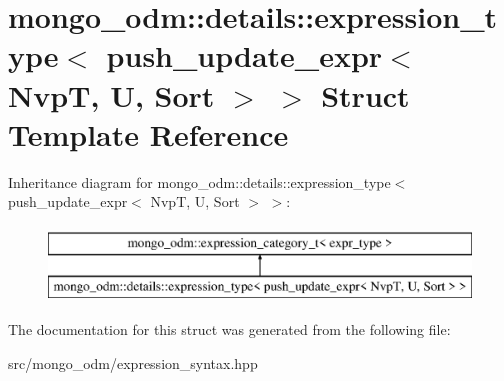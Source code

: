 \hypertarget{structmongo__odm_1_1details_1_1expression__type_3_01push__update__expr_3_01NvpT_00_01U_00_01Sort_01_4_01_4}{}\section{mongo\+\_\+odm\+:\+:details\+:\+:expression\+\_\+type$<$ push\+\_\+update\+\_\+expr$<$ NvpT, U, Sort $>$ $>$ Struct Template Reference}
\label{structmongo__odm_1_1details_1_1expression__type_3_01push__update__expr_3_01NvpT_00_01U_00_01Sort_01_4_01_4}
Inheritance diagram for mongo\+\_\+odm\+:\+:details\+:\+:expression\+\_\+type$<$ push\+\_\+update\+\_\+expr$<$ NvpT, U, Sort $>$ $>$\+:\begin{figure}[H]
\begin{center}
\leavevmode
\includegraphics[height=2.000000cm]{structmongo__odm_1_1details_1_1expression__type_3_01push__update__expr_3_01NvpT_00_01U_00_01Sort_01_4_01_4}
\end{center}
\end{figure}


The documentation for this struct was generated from the following file\+:\begin{DoxyCompactItemize}
\item 
src/mongo\+\_\+odm/expression\+\_\+syntax.\+hpp\end{DoxyCompactItemize}

